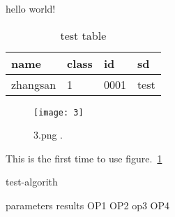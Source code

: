 \documentclass{article}
\begin{document}
hello world!

\begin{table}
\centering
\caption{test table}
\begin{tabular}{l|l|l|l}
\hline
name & class & id &sd\\
\hline
zhangsan & 1 & 0001& test\\\hline
\end{tabular}
\end{table}


\begin{figure}[h]
\label{testfigure}
\centering
\texttt{[image: 3]}
\caption{3.png .}
\end{figure}
This is the first time to use figure.~\ref{testfigure}


\begin{algorithm}
\caption{test-algorith}
\label{test-algorithm}
\begin{algorithmic}
\REQUIRE parameters
\ENSURE results
\STATE OP1
\STATE OP2
	\STATE op3
		\STATE OP4
	\ENDIF
\ENDFOR


\end{algorithmic}
\end{algorithm}
\end{document}
